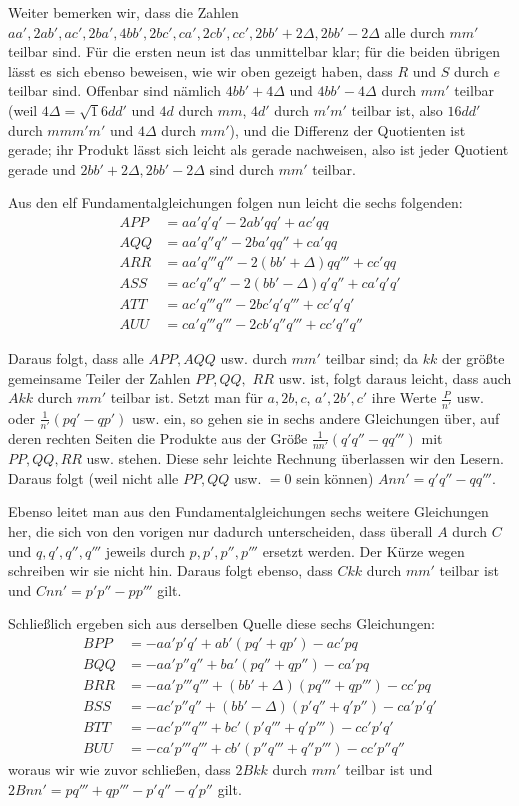 Weiter bemerken wir, dass die Zahlen $aa',\allowbreak 2ab',\allowbreak ac',\allowbreak 2ba',\allowbreak 4bb',\allowbreak 2bc',\allowbreak ca',\allowbreak 2cb',\allowbreak cc',\allowbreak 2bb'+2\Delta,\allowbreak 2bb'-2\Delta$ alle durch $mm'$ teilbar sind. Für die ersten neun ist das unmittelbar klar; für die beiden übrigen lässt es sich ebenso beweisen, wie wir oben gezeigt haben, dass $R$ und $S$ durch $e$ teilbar sind. Offenbar sind nämlich $4bb'+4\Delta$ und $4bb'-4\Delta$ durch $mm'$ teilbar (weil $4\Delta=\surd16dd'$ und $4d$ durch $mm$, $4d'$ durch $m'm'$ teilbar ist, also $16dd'$ durch $mmm'm'$ und $4\Delta$ durch $mm'$), und die Differenz der Quotienten ist gerade; ihr Produkt lässt sich leicht als gerade nachweisen, also ist jeder Quotient gerade und $2bb'+2\Delta,2bb'-2\Delta$ sind durch $mm'$ teilbar.

Aus den elf Fundamentalgleichungen folgen nun leicht die sechs folgenden:
\[
\begin{aligned}
APP&=aa'q'q'-2ab'qq'+ac'qq\\
AQQ&=aa'q''q''-2ba'qq''+ca'qq\\
ARR&=aa'q'''q'''-2(bb'+\Delta)qq'''+cc'qq\\
ASS&=ac'q''q''-2(bb'-\Delta)q'q''+ca'q'q'\\
ATT&=ac'q'''q'''-2bc'q'q'''+cc'q'q'\\
AUU&=ca'q'''q'''-2cb'q''q'''+cc'q''q''
\end{aligned}
\]

Daraus folgt, dass alle $APP,AQQ$ usw. durch $mm'$ teilbar sind; da $kk$ der größte gemeinsame Teiler der Zahlen $PP,QQ,$
$RR$ usw. ist, folgt daraus leicht, dass auch $Akk$ durch $mm'$ teilbar ist. Setzt man für $a,2b,c$, $a',2b',c'$ ihre Werte $\frac{P}{n'}$ usw. oder $\frac{1}{n'}(pq'-qp')$ usw. ein, so gehen sie in sechs andere Gleichungen über, auf deren rechten Seiten die Produkte aus der Größe $\frac{1}{nn'}(q'q''-qq''')$ mit $PP,QQ,RR$ usw. stehen. Diese sehr leichte Rechnung überlassen wir den Lesern. Daraus folgt (weil nicht alle $PP,QQ$ usw. $=0$ sein können) $Ann'=q'q''-qq'''$.

Ebenso leitet man aus den Fundamentalgleichungen sechs weitere Gleichungen her, die sich von den vorigen nur dadurch unterscheiden, dass überall $A$ durch $C$ und $q,q',q'',q'''$ jeweils durch $p,p',p'',p'''$ ersetzt werden. Der Kürze wegen schreiben wir sie nicht hin. Daraus folgt ebenso, dass $Ckk$ durch $mm'$ teilbar ist und $Cnn'=p'p''-pp'''$ gilt.

Schließlich ergeben sich aus derselben Quelle diese sechs Gleichungen:
\[
\begin{aligned}
BPP&=-aa'p'q'+ab'(pq'+qp')-ac'pq\\
BQQ&=-aa'p''q''+ba'(pq''+qp'')-ca'pq\\
BRR&=-aa'p'''q'''+(bb'+\Delta)(pq'''+qp''')-cc'pq\\
BSS&=-ac'p''q''+(bb'-\Delta)(p'q''+q'p'')-ca'p'q'\\
BTT&=-ac'p'''q'''+bc'(p'q'''+q'p''')-cc'p'q'\\
BUU&=-ca'p'''q'''+cb'(p''q'''+q''p''')-cc'p''q''
\end{aligned}
\]
woraus wir wie zuvor schließen, dass $2Bkk$ durch $mm'$ teilbar ist und $2Bnn'=pq'''+qp'''-p'q''-q'p''$ gilt.

